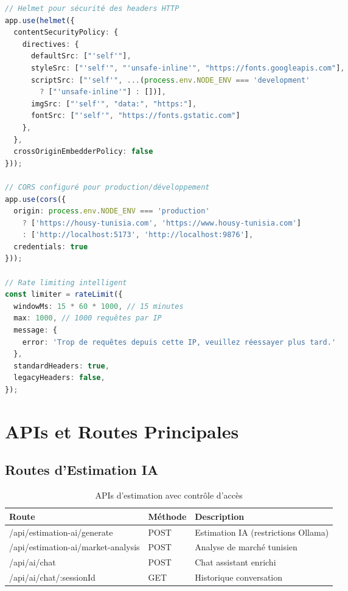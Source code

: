 \begin{lstlisting}[language=TypeScript, caption=Configuration sécurité avancée]
// Helmet pour sécurité des headers HTTP
app.use(helmet({
  contentSecurityPolicy: {
    directives: {
      defaultSrc: ["'self'"],
      styleSrc: ["'self'", "'unsafe-inline'", "https://fonts.googleapis.com"],
      scriptSrc: ["'self'", ...(process.env.NODE_ENV === 'development' 
        ? ["'unsafe-inline'"] : [])],
      imgSrc: ["'self'", "data:", "https:"],
      fontSrc: ["'self'", "https://fonts.gstatic.com"]
    },
  },
  crossOriginEmbedderPolicy: false
}));

// CORS configuré pour production/développement
app.use(cors({
  origin: process.env.NODE_ENV === 'production' 
    ? ['https://housy-tunisia.com', 'https://www.housy-tunisia.com']
    : ['http://localhost:5173', 'http://localhost:9876'],
  credentials: true
}));

// Rate limiting intelligent
const limiter = rateLimit({
  windowMs: 15 * 60 * 1000, // 15 minutes
  max: 1000, // 1000 requêtes par IP
  message: {
    error: 'Trop de requêtes depuis cette IP, veuillez réessayer plus tard.'
  },
  standardHeaders: true,
  legacyHeaders: false,
});
\end{lstlisting}

\section{APIs et Routes Principales}

\subsection{Routes d'Estimation IA}

\begin{table}[H]
\centering
\caption{APIs d'estimation avec contrôle d'accès}
\begin{tabular}{|l|l|l|}
\hline
\textbf{Route} & \textbf{Méthode} & \textbf{Description} \\
\hline
/api/estimation-ai/generate & POST & Estimation IA (restrictions Ollama) \\
\hline
/api/estimation-ai/market-analysis & POST & Analyse de marché tunisien \\
\hline
/api/ai/chat & POST & Chat assistant enrichi \\
\hline
/api/ai/chat/:sessionId & GET & Historique conversation \\
\hline
\end{tabular}
\end{table}

